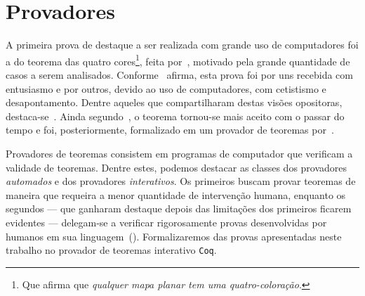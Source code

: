 \section{Provadores}

A primeira prova de destaque a ser realizada com grande uso de computadores foi a do teorema das quatro cores\footnote{Que afirma que \emph{qualquer mapa planar tem uma quatro-coloração}.}, feita por~\cite{Appel}, motivado pela grande quantidade de casos a serem analisados.
Conforme~\cite{Wilson} afirma, esta prova foi por uns recebida com entusiasmo e por outros, devido ao uso de computadores, com cetistismo e desapontamento.
Dentre aqueles que compartilharam destas visões opositoras, destaca-se~\cite{Tymoczko}.
Ainda segundo~\cite{Wilson}, o teorema tornou-se mais aceito com o passar do tempo e foi, posteriormente, formalizado em um provador de teoremas por~\cite{Gonthier}.

Provadores de teoremas consistem em programas de computador que verificam a validade de teoremas. Dentre estes, podemos destacar as classes dos provadores \emph{automados} e dos provadores \emph{interativos}. Os primeiros buscam provar teoremas de maneira que requeira a menor quantidade de intervenção humana, enquanto os segundos --- que ganharam destaque depois das limitações dos primeiros ficarem evidentes --- delegam-se a verificar rigorosamente provas desenvolvidas por humanos em sua linguagem~(). Formalizaremos das provas apresentadas neste trabalho no provador de teoremas interativo \texttt{Coq}.
